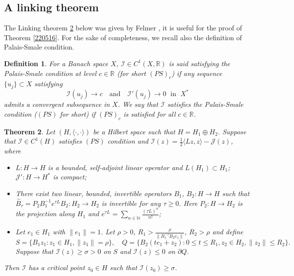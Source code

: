 \documentclass[10pt]{article}
\numberwithin{equation}{section}
\newtheorem{theorem}{Theorem}[section]
\newtheorem{definition}[theorem]{Definition}
\newcommand{\R}{\mathbb R}
\def \N{{\mathbb N}}
\numberwithin{equation}{section}
\begin{document}
\subsection{A linking theorem} The Linking theorem \ref{2210091640} below was given by Felmer \cite[Theorem 3.1]{Felmer1993}, it is useful for the proof of Theorem \ref{220516}. For the sake of completeness, we recall also the definition of Palais-Smale condition.
\begin{definition}
For a Banach space $X$,  ${\mathcal I}\in C^1(X, \mathbb{R})$ is said satisfying the Palais-Smale condition at level $c\in \mathbb{R}$ {\rm (}for short $(PS)_c${\rm )} if any sequence $\{u_j\}\subset X$ satisfying
\begin{equation*}\label{eq2.4}
{\mathcal I}(u_j)\rightarrow c \quad \mbox{and}\quad {\mathcal I}'(u_j) \rightarrow 0 \; \mbox{ in }\;  X^*
\end{equation*}
admits a convergent subsequence in $X$. We say that ${\mathcal I}$ satisfies the Palais-Smale condition {\rm (}$(PS)$ for short{\rm )} if $(PS)_c$ is satisfied for all $c\in \R$.
\end{definition}

\begin{theorem}\label{2210091640}
Let $(H, \langle \cdot, \cdot \rangle)$ be a Hilbert space such that $H=H_1\oplus H_2$. Suppose that $\mathcal{I}\in C^1(H)$ satisfies $(PS)$ condition and $\mathcal{I}(z)=\frac12 \langle Lz, z\rangle-\mathcal{J}(z)$, where
\begin{itemize}
\item[\rm (i)] $L : H\to H$ is a bounded, self-adjoint linear operator and $L(H_1) \subset H_1$; $\mathcal{J}' : H\to H^*$ is compact;
\item[\rm (ii)] There exist two linear, bounded, invertible operators $B_1$, $B_2 : H\to H$ such that $\widehat{B}_{\tau}=P_2B_1^{-1}e^{\tau L}B_2: H_2\to H_2$  is invertible for any $\tau\ge 0$. Here $P_2: H\to H_2$ is the projection along $H_1$ and $e^{\tau L}=\sum_{n\in \N}\frac{(\tau L)^n}{n!}$;
\item[\rm (iii)] Let $e_1\in H_1$ with $\|e_1\|=1$. Let $\rho>0$, $R_1>\frac{\rho}{\|B_1^{-1}B_2 e_1\|}$, $R_2>\rho$ and define
$$
S =\{B_1z_1 : z_1\in H_1, \|z_1\|=\rho\},\quad
Q =\{B_2(te_1+z_2) : 0\le t\le R_1, z_2\in H_2, \|z_2\|\le R_2\}.
$$
Suppose that $\mathcal{I}(z)\ge \sigma >0$ on $S$ and $\mathcal{I}(z)\le 0$ on $\partial Q$.\end{itemize}
Then $\mathcal{I}$ has a critical point $z_0 \in H$ such that $\mathcal{I}(z_0)\ge \sigma$.
\end{theorem}
\end{document}
